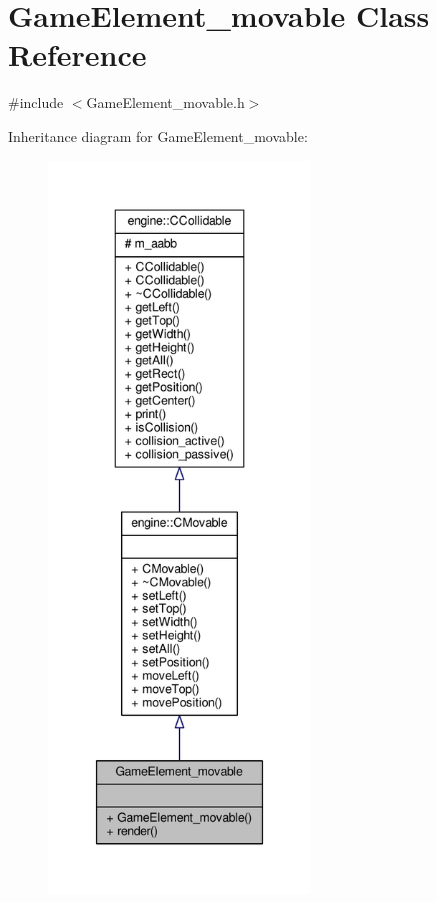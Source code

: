 \hypertarget{classGameElement__movable}{\section{Game\-Element\-\_\-movable Class Reference}
\label{classGameElement__movable}
}


{\ttfamily \#include $<$Game\-Element\-\_\-movable.\-h$>$}



Inheritance diagram for Game\-Element\-\_\-movable\-:
\nopagebreak
\begin{figure}[H]
\begin{center}
\leavevmode
\includegraphics[height=550pt]{classGameElement__movable__inherit__graph}
\end{center}
\end{figure}


